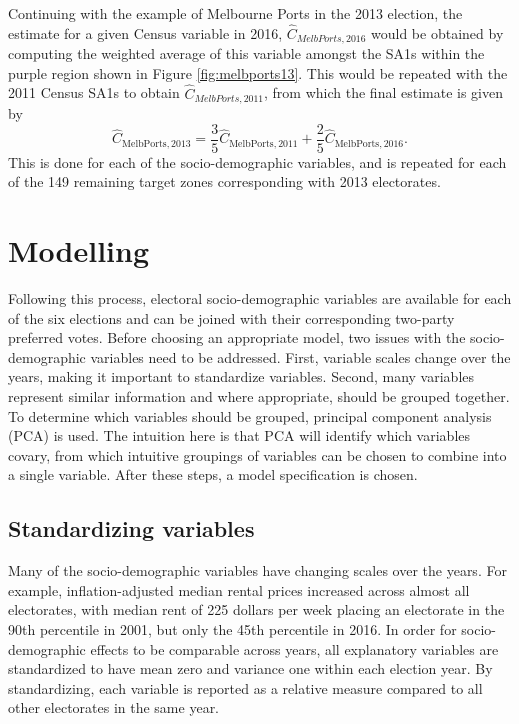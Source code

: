 \documentclass[times, doublespace]{anzsauth}
\begin{document}
Continuing with the example of Melbourne Ports in the 2013 election, the estimate for a given Census variable in 2016, \(\hat{C}_{MelbPorts, 2016}\) would be obtained by computing the weighted average of this variable amongst the SA1s within the purple region shown in Figure \ref{fig:melbports13}. This would be repeated with the 2011 Census SA1s to obtain \(\hat{C}_{MelbPorts, 2011}\), from which the final estimate is given by
\[
  \hat{C}_{\text{MelbPorts},2013}
    = \frac{3}{5} \hat{C}_{\text{MelbPorts},2011} + \frac{2}{5} \hat{C}_{\text{MelbPorts},2016}.
\]
This is done for each of the socio-demographic variables, and is repeated for each of the 149 remaining target zones corresponding with 2013 electorates.

\hypertarget{modelling}{%
\section{Modelling}\label{modelling}}

Following this process, electoral socio-demographic variables are available for each of the six elections and can be joined with their corresponding two-party preferred votes. Before choosing an appropriate model, two issues with the socio-demographic variables need to be addressed. First, variable scales change over the years, making it important to standardize variables. Second, many variables represent similar information and where appropriate, should be grouped together. To determine which variables should be grouped, principal component analysis (PCA) is used. The intuition here is that PCA will identify which variables covary, from which intuitive groupings of variables can be chosen to combine into a single variable. After these steps, a model specification is chosen.

\hypertarget{standardizing-variables}{%
\subsection{Standardizing variables}\label{standardizing-variables}}

Many of the socio-demographic variables have changing scales over the years. For example, inflation-adjusted median rental prices increased across almost all electorates, with median rent of 225 dollars per week placing an electorate in the 90th percentile in 2001, but only the 45th percentile in 2016. In order for socio-demographic effects to be comparable across years, all explanatory variables are standardized to have mean zero and variance one within each election year. By standardizing, each variable is reported as a relative measure compared to all other electorates in the same year.
\end{document}
